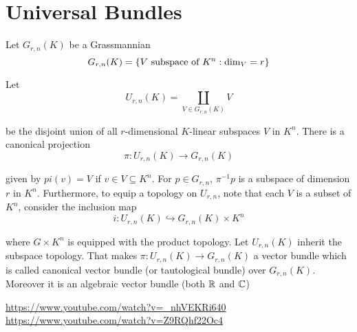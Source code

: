 \begin{definition}
\end{definition}

\section{Universal Bundles}

\begin{definition}
	Let $G_{r,n}(K)$ be a Grassmannian
	$$
	G_{r,n}(K) = \{V \text{ subspace of } K^n: \dim_{V} = r\}
	$$
	
	Let
	$$
	U_{r,n}(K) = \coprod_{V \in G_{r,n}(K)} V
	$$
	
	be the disjoint union of all $r$-dimensional $K$-linear subspaces $V$ in $K^n$. There is a canonical projection
	$$
	\pi: U_{r,n}(K) \to  G_{r,n}(K)
	$$
	
	given by $pi(v) = V$ if $v \in V \subseteq K^n$. For $p \in G_{r,n}$, $\pi^{-1} p$ is a subspace of dimension $r$ in $K^n$. Furthermore, to equip a topology on $U_{r, n}$, note that each $V$ is a subset of $K^n$, consider the inclusion map
	$$
	i: U_{r,n}(K) \hookrightarrow G_{r,n}(K) \times K^n
	$$
	
	where $G \times K^n$ is equipped with the product topology. Let $U_{r,n}(K)$ inherit the subspace topology. That makes $\pi: U_{r,n}(K) \to  G_{r,n}(K)$ a vector bundle which is called canonical vector bundle (or tautological bundle) over $G_{r,n}(K)$. Moreover it is an algebraic vector bundle (both $\mathbb{R}$ and $\mathbb{C}$)
	
	 \url{https://www.youtube.com/watch?v=_nhVEKRi640} \url{https://www.youtube.com/watch?v=Z9RQhf22Oc4}
\end{definition}

